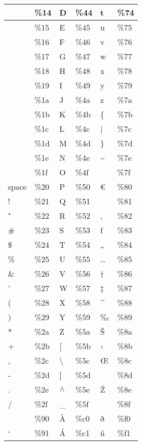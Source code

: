 \begin{longtable}{|l|l|l|l|l|l|}
\hline
 			&\%14		& D			&\%44		& t			&\%74		\\
\hline
 			&\%15		& E			&\%45		& u			&\%75		\\
\hline
 			&\%16		& F			&\%46		& v			&\%76		\\
\hline
 			&\%17		& G			&\%47		& w			&\%77		\\
\hline
 			&\%18		& H			&\%48		& x			&\%78		\\
\hline
 			&\%19		& I			&\%49		& y			&\%79		\\
\hline
 			&\%1a	 	& J			&\%4a		& z			&\%7a 		\\
\hline
 			&\%1b	 	& K			&\%4b		&\{			&\%7b 		\\
\hline
 			&\%1c		& L			&\%4c		& |			&\%7c 		\\
\hline
 			&\%1d		& M			&\%4d		& \}			&\%7d 		\\
\hline
 			&\%1e		& N			&\%4e		& {\~{}}		&\%7e 		\\
\hline
 			&\%1f 		& O			&\%4f	 	&			&\%7f 		\\
\hline
space		&\%20		& P			&\%50		&€			&\%80		\\
\hline
!			&\%21		& Q	 		&\%51	 	& 			&\%81		\\
\hline
"			&\%22		& R			&\%52		&‚			&\%82		\\
\hline
\#			&\%23		& S			&\%53	 	&ƒ			&\%83		\\
\hline
\$			&\%24		& T			&\%54		&„			&\%84		\\
\hline
\%			&\%25		& U			&\%55		&…			&\%85		\\
\hline
\&			&\%26		&V			&\%56		&†			&\%86		\\
\hline
'			&\%27		& W			&\%57		&‡			&\%87		\\
\hline
(			&\%28		& X			&\%58		&{\^{}}		&\%88		\\
\hline
)			&\%29		& Y			&\%59		&‰			&\%89		\\
\hline
*			&\%2a		& Z			& \%5a		&Š			&\%8a 		\\
\hline
+			&\%2b		&[			&\%5b		&‹			&\%8b 		\\
\hline
,			&\%2c		&\textbackslash&\%5c		&Œ			&\%8c 		\\
\hline
-			&\%2d		&]			&\%5d		& 			&\%8d 		\\
\hline
.			&\%2e		&$\wedge$	&\%5e		&Ž			&\%8e 		\\
\hline
/			&\%2f		&\_			&\%5f	 	&			&\%8f 		\\
\hline
 			&\%90		& À			&\%c0		&ð			&\%f0		\\
\hline
‘			&\%91		& Á			&\%c1		&ñ			&\%f1		\\

\end{longtable}
